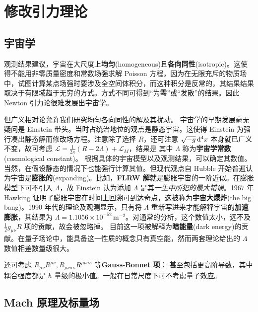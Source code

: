 \section{修改引力理论}
\subsection{宇宙学}
观测结果建议，宇宙在大尺度上\textbf{均匀}(homogeneous)且\textbf{各向同性}(isotropic)。这使得不能用非零质量密度和常数场强求解 Poisson 方程，因为在无限充斥的物质场中，试图计算某点场强时要涉及全空间体积分，而这种积分是反常的，其结果结果取决于有限域趋于无穷的方式。方式不同可得到“为零”或“发散”的结果。因此 Newton 引力论很难发展出宇宙学。

但广义相对论允许我们研究均匀各向同性的解及其扰动。
宇宙学的早期发展毫无疑问是 Einstein 带头。当时占统治地位的观点是静态宇宙。这使得 Einstein 为强行凑出静态解而修改场方程。注意除了选择 $R$，还可注意 $\sqrt{-g}\dd[4]{x}$ 本身就已广义不变，故可考虑 $\mathcal L=\frac{1}{2\kappa}\left(R-2\Lambda\right)+\mathcal L_M$，结果是
其中 $\Lambda$ 称为\textbf{宇宙学常数}(cosmological constant)。
根据具体的宇宙模型以及观测结果，可以确定其数值。
当然，在假设静态的情况下也能强行计算其值。但现代观点自 Hubble 开始普遍认为宇宙是\textbf{膨胀的}(expanding)。比如，\textbf{FLRW 解}就是膨胀宇宙的一阶近似。在膨胀模型下可不引入 $\Lambda$，故 Einstein 认为添加 $\Lambda$ 是其\textit{一生中所犯的最大错误}。1967 年 Hawking 证明了膨胀宇宙在时间上回溯可到达奇点，这被称为\textbf{宇宙大爆炸}(the big bang)。1990 年代的理论及观测显示，只有将 $\Lambda$ 重新写进来才能解释宇宙的\textbf{加速膨胀}，其结果为 $\Lambda=1.1056\times 10^{-52}$\,m$^{-2}$。对通常的分析，这个数值太小，远不及 $\frac12 g_{\mu\nu} R$ 项的贡献，故会被忽略掉。
目前这一项被解释为\textbf{暗能量}(dark energy)的贡献。在量子场论中，能具备这一性质的概念只有真空能，然而两套理论给出的 $\Lambda$ 数值相差数量级很大。

还可考虑 $R_{\mu\nu} R^{\mu\nu},R_{\mu\nu\sigma\kappa}R^{\mu\nu\sigma\kappa}$ 等\textbf{Gauss-Bonnet 项}：
甚至包括更高阶导数，其中耦合强度都是 $\hbar$ 量级的极小值。一般在日常尺度下可不考虑量子效应。

\subsection{Mach 原理及标量场}

